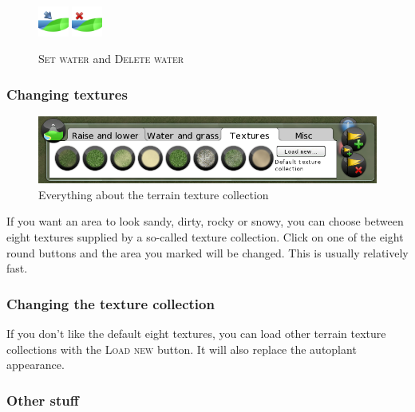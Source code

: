 \documentclass[a4paper]{article}
\newcommand{\ccaption}[1]{\textsc{#1}}
\begin{document}
\begin{figure}[h]
  \begin{center}
    \includegraphics[width=10mm]{../images/terrain-setwater.png}
    \includegraphics[width=10mm]{../images/terrain-deletewater.png}
  \end{center}
  \caption{\ccaption{Set water} and \ccaption{Delete water}}
\end{figure}

\subsubsection{Changing textures}

\begin{figure}[h]
  \begin{center}
    \includegraphics[width=140mm]{./images/terrain-03.png}
  \end{center}
  \caption{Everything about the terrain texture collection}
\end{figure}

If you want an area to look sandy, dirty, rocky or snowy, you can choose between eight textures supplied by a so-called texture collection.
Click on one of the eight round buttons and the area you marked will be changed. This is usually relatively fast.

\subsubsection{Changing the texture collection}
If you don't like the default eight textures, you can load other terrain texture collections with the \ccaption{Load new} button.
It will also replace the autoplant appearance.

\subsubsection{Other stuff}
\end{document}
